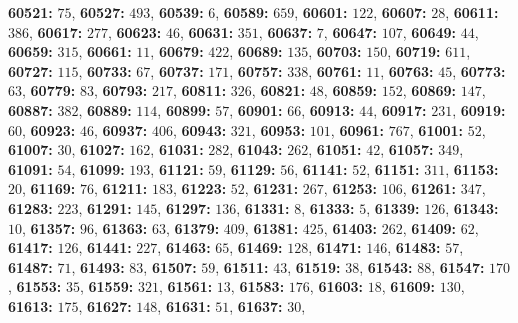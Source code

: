 \textsf{\bfseries 60521:} $75$, \textsf{\bfseries 60527:} $493$, \textsf{\bfseries 60539:} $6$, \textsf{\bfseries 60589:} $659$, \textsf{\bfseries 60601:} $122$, \textsf{\bfseries 60607:} $28$, \textsf{\bfseries 60611:} $386$, \textsf{\bfseries 60617:} $277$, \textsf{\bfseries 60623:} $46$, \textsf{\bfseries 60631:} $351$, \textsf{\bfseries 60637:} $7$, \textsf{\bfseries 60647:} $107$, \textsf{\bfseries 60649:} $44$, \textsf{\bfseries 60659:} $315$, \textsf{\bfseries 60661:} $11$, \textsf{\bfseries 60679:} $422$, \textsf{\bfseries 60689:} $135$, \textsf{\bfseries 60703:} $150$, \textsf{\bfseries 60719:} $611$, \textsf{\bfseries 60727:} $115$, \textsf{\bfseries 60733:} $67$, \textsf{\bfseries 60737:} $171$, \textsf{\bfseries 60757:} $338$, \textsf{\bfseries 60761:} $11$, \textsf{\bfseries 60763:} $45$, \textsf{\bfseries 60773:} $63$, \textsf{\bfseries 60779:} $83$, \textsf{\bfseries 60793:} $217$, \textsf{\bfseries 60811:} $326$, \textsf{\bfseries 60821:} $48$, \textsf{\bfseries 60859:} $152$, \textsf{\bfseries 60869:} $147$, \textsf{\bfseries 60887:} $382$, \textsf{\bfseries 60889:} $114$, \textsf{\bfseries 60899:} $57$, \textsf{\bfseries 60901:} $66$, \textsf{\bfseries 60913:} $44$, \textsf{\bfseries 60917:} $231$, \textsf{\bfseries 60919:} $60$, \textsf{\bfseries 60923:} $46$, \textsf{\bfseries 60937:} $406$, \textsf{\bfseries 60943:} $321$, \textsf{\bfseries 60953:} $101$, \textsf{\bfseries 60961:} $767$, \textsf{\bfseries 61001:} $52$, \textsf{\bfseries 61007:} $30$, \textsf{\bfseries 61027:} $162$, \textsf{\bfseries 61031:} $282$, \textsf{\bfseries 61043:} $262$, \textsf{\bfseries 61051:} $42$, \textsf{\bfseries 61057:} $349$, \textsf{\bfseries 61091:} $54$, \textsf{\bfseries 61099:} $193$, \textsf{\bfseries 61121:} $59$, \textsf{\bfseries 61129:} $56$, \textsf{\bfseries 61141:} $52$, \textsf{\bfseries 61151:} $311$, \textsf{\bfseries 61153:} $20$, \textsf{\bfseries 61169:} $76$, \textsf{\bfseries 61211:} $183$, \textsf{\bfseries 61223:} $52$, \textsf{\bfseries 61231:} $267$, \textsf{\bfseries 61253:} $106$, \textsf{\bfseries 61261:} $347$, \textsf{\bfseries 61283:} $223$, \textsf{\bfseries 61291:} $145$, \textsf{\bfseries 61297:} $136$, \textsf{\bfseries 61331:} $8$, \textsf{\bfseries 61333:} $5$, \textsf{\bfseries 61339:} $126$, \textsf{\bfseries 61343:} $10$, \textsf{\bfseries 61357:} $96$, \textsf{\bfseries 61363:} $63$, \textsf{\bfseries 61379:} $409$, \textsf{\bfseries 61381:} $425$, \textsf{\bfseries 61403:} $262$, \textsf{\bfseries 61409:} $62$, \textsf{\bfseries 61417:} $126$, \textsf{\bfseries 61441:} $227$, \textsf{\bfseries 61463:} $65$, \textsf{\bfseries 61469:} $128$, \textsf{\bfseries 61471:} $146$, \textsf{\bfseries 61483:} $57$, \textsf{\bfseries 61487:} $71$, \textsf{\bfseries 61493:} $83$, \textsf{\bfseries 61507:} $59$, \textsf{\bfseries 61511:} $43$, \textsf{\bfseries 61519:} $38$, \textsf{\bfseries 61543:} $88$, \textsf{\bfseries 61547:} $170$, \textsf{\bfseries 61553:} $35$, \textsf{\bfseries 61559:} $321$, \textsf{\bfseries 61561:} $13$, \textsf{\bfseries 61583:} $176$, \textsf{\bfseries 61603:} $18$, \textsf{\bfseries 61609:} $130$, \textsf{\bfseries 61613:} $175$, \textsf{\bfseries 61627:} $148$, \textsf{\bfseries 61631:} $51$, \textsf{\bfseries 61637:} $30$, 
